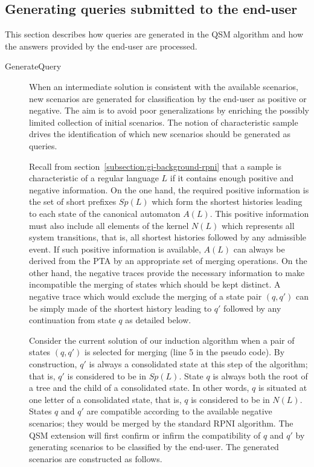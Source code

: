 \subsection{Generating queries submitted to the end-user\label{QSM:query}}

This section describes how queries are generated in the \textsc{QSM} algorithm and how the answers provided by the end-user are processed.

\begin{description}

\item[GenerateQuery] When an intermediate solution is consistent with the available scenarios, new scenarios are generated for classification by the end-user as positive or negative. The aim is to avoid poor generalizations by enriching the possibly limited collection of initial scenarios. The notion of characteristic sample drives the identification of which new scenarios should be generated as queries. 

Recall from section~\ref{subsection:gi-background-rpni} that a sample is characteristic of a regular language $L$ if it contains enough positive and negative information. On the one hand, the required positive information is the set of short prefixes $Sp(L)$ which form the shortest histories leading to each state of the canonical automaton $A(L)$. This positive information must also include all elements of the kernel $N(L)$ which represents all system transitions, that is, all shortest histories followed by any admissible event. If such positive information is available, $A(L)$ can always be derived from the PTA by an appropriate set of merging operations. On the other hand, the negative traces provide the necessary information to make incompatible the merging of states which should be kept distinct. A negative trace which would exclude the merging of a state pair $(q, q')$ can be simply made of the shortest history leading to $q'$ followed by any continuation from state $q$ as detailed below.

Consider the current solution of our induction algorithm when a pair of states $(q, q')$ is selected for merging (line 5 in the pseudo code). By construction, $q'$ is always a consolidated state at this step of the algorithm; that is, $q'$ is considered to be in $Sp(L)$. State $q$ is always both the root of a tree and the child of a consolidated state. In other words, $q$ is situated at one letter of a consolidated state, that is, $q$ is considered to be in $N(L)$. States $q$ and $q'$ are compatible according to the available negative scenarios; they would be merged by the standard RPNI algorithm. The QSM extension will first confirm or infirm the compatibility of $q$ and $q'$ by generating scenarios to be classified by the end-user. The generated scenarios are constructed as follows.


\end{description}
